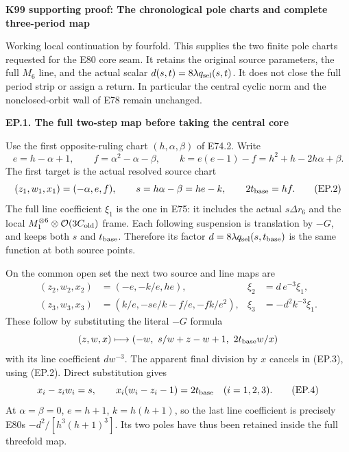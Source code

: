 \par\bigskip\noindent\textbf{K99 supporting proof: The chronological pole charts and complete three-period map}\par\nobreak
Working local continuation by fourfold. This supplies the two finite
pole charts requested for the E80 core seam. It retains the original
source parameters, the full \(M_6\) line, and the actual scalar
\(d(s,t)=8\lambda q_{\rm sel}(s,t)\). It does not close the full
period strip or assign a return. In particular the central cyclic
norm and the nonclosed-orbit wall of E78 remain unchanged.

\par

\medskip\noindent\textbf{EP.1. The full two-step map before taking the central core}

\par\nobreak

Use the first opposite-ruling chart \((h,\alpha,\beta)\) of E74.2.
Write
\[
 e=h-\alpha+1,\qquad f=\alpha^2-\alpha-\beta,\qquad
 k=e(e-1)-f=h^2+h-2h\alpha+\beta .
 \tag{EP.1}
\]
The first target is the actual resolved source chart
\[
 (z_1,w_1,x_1)=(-\alpha,e,f),\qquad
 s=h\alpha-\beta=he-k,\qquad 2t_{\rm base}=hf .
 \tag{EP.2}
\]
The full line coefficient \(\xi_1\) is the one in E75:
it includes the actual \(s\Delta r_6\) and the local
\(M_1^{\otimes6}\otimes\mathcal O(3C_{\rm old})\) frame.
Each following suspension is translation by \(-G\), and keeps
both \(s\) and \(t_{\rm base}\). Therefore its factor
\(d=8\lambda q_{\rm sel}(s,t_{\rm base})\) is the same function
at both source points.

On the common open set the next two source and line maps are
\[
 \begin{aligned}
 (z_2,w_2,x_2)&=(-e,-k/e,he),&
 \xi_2&=d\,e^{-3}\xi_1,\\
 (z_3,w_3,x_3)&=
 \left(k/e,-se/k-f/e,-fk/e^2\right),&
 \xi_3&=-d^2 k^{-3}\xi_1 .
 \end{aligned}
 \tag{EP.3}
\]
These follow by substituting the literal \(-G\) formula
\[
 (z,w,x)\longmapsto
 \left(-w,\ s/w+z-w+1,\ 2t_{\rm base}w/x\right)
\]
with its line coefficient \(dw^{-3}\). The apparent final
division by \(x\) cancels in (EP.3), using (EP.2).
Direct substitution gives
\[
 x_i-z_iw_i=s,\qquad
 x_i(w_i-z_i-1)=2t_{\rm base}\quad(i=1,2,3).
 \tag{EP.4}
\]
At \(\alpha=\beta=0\), \(e=h+1\), \(k=h(h+1)\), so the
last line coefficient is precisely E80\textquotesingle s
\(-d^2/[h^3(h+1)^3]\). Its two poles have thus been retained
inside the full threefold map.

